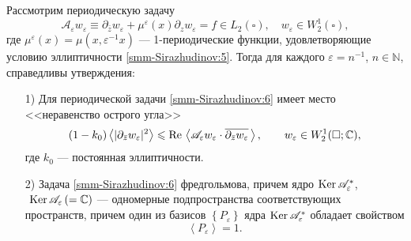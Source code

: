 \begin{lemma}\label{smm-lem1.5}
	Рассмотрим периодическую задачу
	\begin{equation}\label{smm-Sirazhudinov:6}
		\mathscr{A}_\varepsilon w_\varepsilon\equiv
		\partial_{\bar z}w_\varepsilon+\mu^\varepsilon(x)\partial_zw_\varepsilon
		=f\in L_2(\square),\quad w_\varepsilon\in W_2^1(\square),
	\end{equation}
	где $\mu^\varepsilon(x)=\mu(x,\varepsilon^{-1}x)$ 	--- {1}-периодические функции, удовлетворяющие условию эллиптичности \eqref{smm-Sirazhudinov:5}.
	Тогда для каждого $\varepsilon=n^{-1}$, $n\in \mathbb N$, справедливы утверждения:
	\begin{enumerate}
		\item[1)] Для периодической задачи \eqref{smm-Sirazhudinov:6} имеет место <<неравенство острого угла>>
		\begin{equation}\label{smm-Sirazhudinov:7}
			(1-k_0)\left<|\partial_{\bar{z}}w_\varepsilon|^2\right>\leqslant \text{Re\,}\left<\mathscr{A}_\varepsilon w_\varepsilon\cdot \overline{\partial_{\bar{z}}w_\varepsilon}\,\right>,\qquad  w_\varepsilon\in W_2^1(\square;\mathbb{C}),
		\end{equation}
		где $k_0$ --- постоянная эллиптичности.
		\item[2)] Задача \eqref{smm-Sirazhudinov:6} фредгольмова, причем ядро  $\text{Ker\,}\mathscr{A}_\varepsilon^\ast$, $\text{ Ker\,}\mathscr{A}_\varepsilon\,(=\mathbb{C})$
		--- одномерные подпространства соответствующих пространств,
		причем один из базисов $\left\{P_\varepsilon\right\}$ ядра
		$\text{Ker\,}\mathscr{A}_\varepsilon^\ast$ обладает свойством
		\begin{equation*}%
			\left<P_\varepsilon\right>=1.
		\end{equation*}
		\end{enumerate}
\end{lemma}
